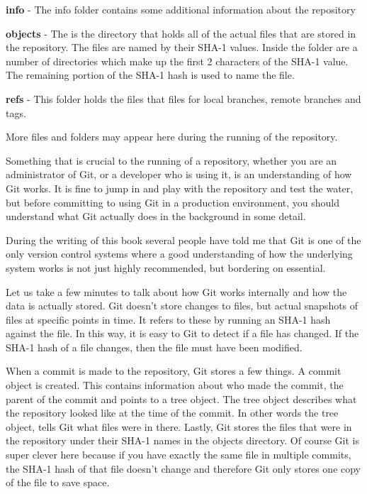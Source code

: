 \textbf{info} - The info folder contains some additional information about the repository

\textbf{objects} - The is the directory that holds all of the actual files that are stored in the repository.  The files are named by their SHA-1 values.  Inside the folder are a number of directories which make up the first 2 characters of the SHA-1 value.  The remaining portion of the SHA-1 hash is used to name the file.

\textbf{refs} - This folder holds the files that files for local branches, remote branches and tags.

More files and folders may appear here during the running of the repository.

Something that is crucial to the running of a repository, whether you are an administrator of Git, or a developer who is using it, is an understanding of how Git works.  It is fine to jump in and play with the repository and test the water, but before committing to using Git in a production environment, you should understand what Git actually does in the background in some detail. 

During the writing of this book several people have told me that Git is one of the only version control systems where a good understanding of how the underlying system works is not just highly recommended, but bordering on essential. 

Let us take a few minutes to talk about how Git works internally and how the data is actually stored.  Git doesn't store changes to files, but actual snapshots of files at specific points in time.  It refers to these by running an SHA-1 hash against the file.  In this way, it is easy to Git to detect if a file has changed.  If the SHA-1 hash of a file changes, then the file must have been modified. 

When a commit is made to the repository, Git stores a few things.  A commit object is created.  This contains information about who made the commit, the parent of the commit and points to a tree object.  The tree object describes what the repository looked like at the time of the commit.  In other words the tree object, tells Git what files were in there.  Lastly, Git stores the files that were in the repository under their SHA-1 names in the objects directory.  Of course Git is super clever here because if you have exactly the same file in multiple commits, the SHA-1 hash of that file doesn't change and therefore Git only stores one copy of the file to save space.

